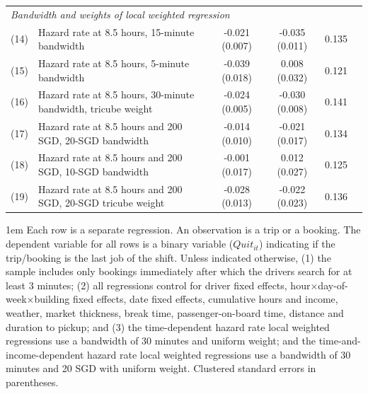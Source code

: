 \documentclass[reviewmode,AEJ]{AEA}
\begin{document}
\begin{table}[]
\begin{tabularx}{\textwidth}{ll@{\extracolsep{\fill}}*{4}{c}}
    	\midrule
    	\multicolumn{5}{l}{\textit{Bandwidth and weights of local weighted regression}} \\
    	(14) & Hazard rate at 8.5 hours, 15-minute bandwidth & -0.021\sym{**} (0.007) & -0.035\sym{**} (0.011) & 0.135 \\
    	(15) & Hazard rate at 8.5 hours, 5-minute bandwidth & -0.039\sym{*} (0.018) & 0.008 (0.032) & 0.121 \\
    	(16) & Hazard rate at 8.5 hours, 30-minute bandwidth, tricube weight & -0.024\sym{***} (0.005) & -0.030\sym{***} (0.008) & 0.141 \\
    	(17) & Hazard rate at 8.5 hours and 200 SGD, 20-SGD bandwidth & -0.014 (0.010) & -0.021 (0.017) & 0.134 \\
    	(18) & Hazard rate at 8.5 hours and 200 SGD, 10-SGD bandwidth & -0.001 (0.017) & 0.012 (0.027) & 0.125 \\
    	(19) & Hazard rate at 8.5 hours and 200 SGD, 20-SGD tricube weight & -0.028\sym{*} (0.013) & -0.022 (0.023) & 0.136 \\
    	\bottomrule
    \end{tabularx}%
    \label{tb:immepickup}
	\begin{tablenotes}
		\parindent 1em%
		\small
	    Each row is a separate regression. An observation is a trip or a booking. The dependent variable for all rows is a binary variable ($Quit_{it}$) indicating if the trip/booking is the last job of the shift. Unless indicated otherwise, (1) the sample includes only bookings immediately after which the drivers search for at least 3 minutes; (2) all regressions control for driver fixed effects, hour\(\times\)day-of-week\(\times\)building fixed effects, date fixed effects,  cumulative hours and income, weather, market thickness, break time, passenger-on-board time, distance and duration to pickup; and (3) the time-dependent hazard rate local weighted regressions use a bandwidth of 30 minutes and uniform weight; and the time-and-income-dependent hazard rate local weighted regressions use a bandwidth of 30 minutes and 20 SGD with uniform weight. Clustered standard errors in parentheses.%
	\end{tablenotes}
    \label{tb:robustcheck}
\end{table}
\end{document}
